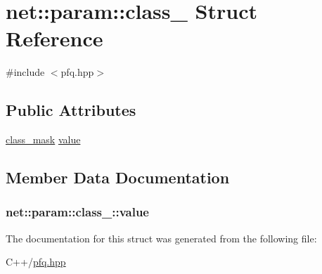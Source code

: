 \hypertarget{structnet_1_1param_1_1class__}{\section{net\-:\-:param\-:\-:class\-\_\- Struct Reference}
\label{structnet_1_1param_1_1class__}
}


{\ttfamily \#include $<$pfq.\-hpp$>$}

\subsection*{Public Attributes}
\begin{DoxyCompactItemize}
\item 
\hyperlink{namespacenet_a1dbd93552dc6ef6fbb0bb79d43ca22fd}{class\-\_\-mask} \hyperlink{structnet_1_1param_1_1class___a0662bf5d26b377299339f531f293fa9b}{value}
\end{DoxyCompactItemize}


\subsection{Member Data Documentation}
\hypertarget{structnet_1_1param_1_1class___a0662bf5d26b377299339f531f293fa9b}{
\subsubsection[{value}]{ net\-::param\-::class\-\_\-\-::value}}\label{structnet_1_1param_1_1class___a0662bf5d26b377299339f531f293fa9b}


The documentation for this struct was generated from the following file\-:\begin{DoxyCompactItemize}
\item 
C++/\hyperlink{pfq_8hpp}{pfq.\-hpp}\end{DoxyCompactItemize}
